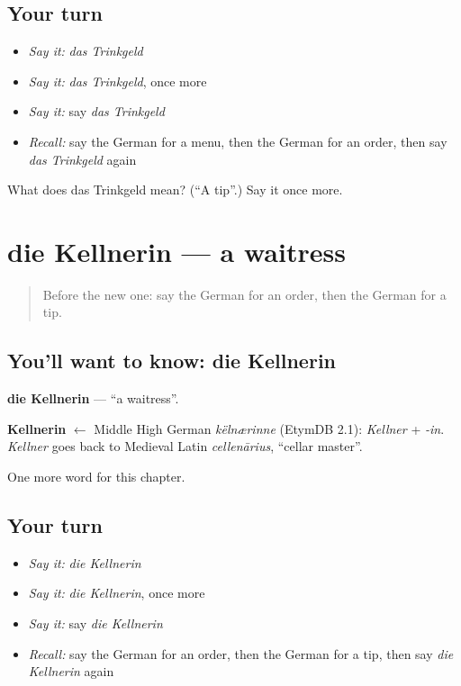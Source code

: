\subsection*{Your turn}
\begin{itemize}
\raggedright
  \item \emph{Say it:} \emph{das Trinkgeld}
  \item \emph{Say it:} \emph{das Trinkgeld}, once more
  \item \emph{Say it:} say \emph{das Trinkgeld}
  \item \emph{Recall:} say the German for a menu, then the German for an order, then say \emph{das Trinkgeld} again
\end{itemize}

\begin{tcolorbox}[breakable,colback=teal!4,colframe=teal!35!black,title={Before you move on}]
What does das Trinkgeld mean? (\textquotedblleft{}A tip\textquotedblright{}.) Say it once more.
\end{tcolorbox}
\section[die Kellnerin]{die Kellnerin — a waitress}

\label{lesson:GE-C200-kellnerin}



\begin{quote}
Before the new one: say the German for an order, then the German for a tip.
\end{quote}

\subsection*{You'll want to know: die Kellnerin}
\textbf{die Kellnerin} — \textquotedblleft{}a waitress\textquotedblright{}.

\begin{cousinweb}
\textbf{Kellnerin} $\leftarrow$ Middle High German \emph{këlnærinne} (EtymDB 2.1): \emph{Kellner} + \emph{-in}. \emph{Kellner} goes back to Medieval Latin \emph{cellenārius}, \textquotedblleft{}cellar master\textquotedblright{}.
\end{cousinweb}

\begin{grammarlens}[title={What you've built}]
One more word for this chapter.
\end{grammarlens}

\subsection*{Your turn}
\begin{itemize}
\raggedright
  \item \emph{Say it:} \emph{die Kellnerin}
  \item \emph{Say it:} \emph{die Kellnerin}, once more
  \item \emph{Say it:} say \emph{die Kellnerin}
  \item \emph{Recall:} say the German for an order, then the German for a tip, then say \emph{die Kellnerin} again
\end{itemize}


